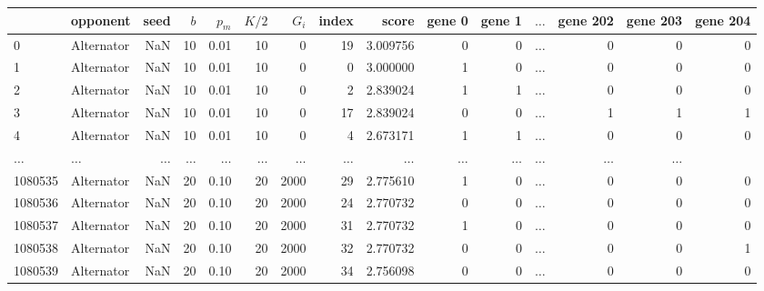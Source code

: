 \begin{tabular}{llrrrrrrrrrrrrr}
\toprule
{} &    opponent &  seed &  $b$ &  $p_m$ &  $K/2$ &  $G_i$ &  index &     score &  gene 0 &  gene 1 &  \(\dots\) &   gene 202 &  gene 203 &  gene 204 \\
\midrule
0       &  Alternator &   NaN &   10 &   0.01 &     10 &      0 &     19 &  3.009756 &       0 &       0  & \(\dots\) &      0 &         0 &         0 \\
1       &  Alternator &   NaN &   10 &   0.01 &     10 &      0 &      0 &  3.000000 &       1 &       0  & \(\dots\) &      0 &         0 &         0 \\
2       &  Alternator &   NaN &   10 &   0.01 &     10 &      0 &      2 &  2.839024 &       1 &       1  & \(\dots\) &      0 &         0 &         0 \\
3       &  Alternator &   NaN &   10 &   0.01 &     10 &      0 &     17 &  2.839024 &       0 &       0  & \(\dots\) &      1 &         1 &         1 \\
4       &  Alternator &   NaN &   10 &   0.01 &     10 &      0 &      4 &  2.673171 &       1 &       1  & \(\dots\) &      0 &         0 &         0 \\
\(\dots\)  &  \(\dots\)  &   \(\dots\)  &   \(\dots\)  & \(\dots\)  &  \(\dots\)  & \(\dots\)          & \(\dots\) &       \(\dots\)  &       \(\dots\)  &  \(\dots\)    & \(\dots\)  &         \(\dots\)  &         \(\dots\)  \\
1080535 &  Alternator &   NaN &   20 &   0.10 &     20 &   2000 &     29 &  2.775610 &       1 &       0  & \(\dots\) &      0 &         0 &         0 \\
1080536 &  Alternator &   NaN &   20 &   0.10 &     20 &   2000 &     24 &  2.770732 &       0 &       0  & \(\dots\) &      0 &         0 &         0 \\
1080537 &  Alternator &   NaN &   20 &   0.10 &     20 &   2000 &     31 &  2.770732 &       1 &       0  & \(\dots\) &      0 &         0 &         0 \\
1080538 &  Alternator &   NaN &   20 &   0.10 &     20 &   2000 &     32 &  2.770732 &       0 &       0  & \(\dots\) &      0 &         0 &         1 \\
1080539 &  Alternator &   NaN &   20 &   0.10 &     20 &   2000 &     34 &  2.756098 &       0 &       0  & \(\dots\) &      0 &         0 &         0 \\
\bottomrule
\end{tabular}
